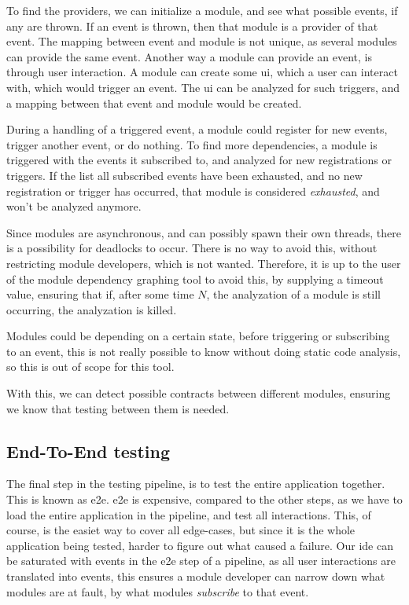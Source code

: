 To find the providers, we can initialize a module, and see what possible
events, if any are thrown. If an event is thrown, then that module is a
provider of that event. The mapping between event and module is not unique,
as several modules can provide the same event. Another way a module can
provide an event, is through user interaction. A module can create some
\gls*{ui}, which a user can interact with, which would trigger an event. The
\gls*{ui} can be analyzed for such triggers, and a mapping between that event and
module would be created.

During a handling of a triggered event, a module could register for new
events, trigger another event, or do nothing. To find more dependencies, a
module is triggered with the events it subscribed to, and analyzed for new
registrations or triggers. If the list all subscribed events have been
exhausted, and no new registration or trigger has occurred, that module is
considered \textit{exhausted}, and won't be analyzed anymore.

Since modules are asynchronous, and can possibly spawn their own threads, there
is a possibility for deadlocks to occur. There is no way to avoid this, without
restricting module developers, which is not wanted. Therefore, it is up to
the user of the module dependency graphing tool to avoid this, by supplying a
timeout value, ensuring that if, after some time $N$, the analyzation of a
module is still occurring, the analyzation is killed.

Modules could be depending on a certain state, before triggering or
subscribing to an event, this is not really possible to know without doing
static code analysis, so this is out of scope for this tool.

With this, we can detect possible contracts between different modules, ensuring
we know that testing between them is needed.


\subsection{End-To-End testing}

The final step in the testing pipeline, is to test the entire application
together. This is known as \gls*{e2e}. \gls*{e2e} is expensive, compared to the
other steps, as we have to load the entire application in the pipeline, and test
all interactions. This, of course, is the easiet way to cover all edge-cases, but
since it is the whole application being tested, harder to figure out what caused
a failure. Our \gls*{ide} can be saturated with events in the \gls*{e2e} step of a
pipeline, as all user interactions are translated into events, this ensures a
module developer can narrow down what modules are at fault, by what modules
\textit{subscribe} to that event.

